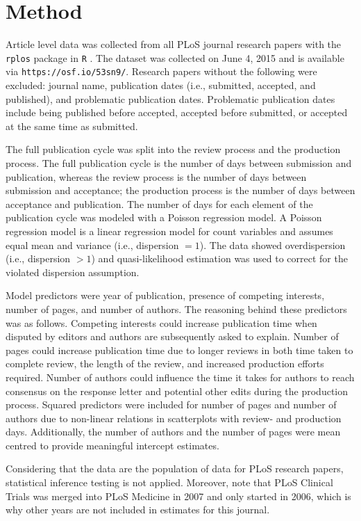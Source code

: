 \section*{Method}
Article level data was collected from all PLoS journal research papers with the \texttt{rplos} package \cite[v0.4.7][]{rplos} in \texttt{R} \cite[v3.2.0][]{rcran}. The dataset was collected on June 4, 2015 and is available via \texttt{https://osf.io/53sn9/}. Research papers without the following were excluded: journal name, publication dates (i.e., submitted, accepted, and published), and problematic publication dates. Problematic publication dates include being published before accepted, accepted before submitted, or accepted at the same time as submitted.

The full publication cycle was split into the review process and the production process. The full publication cycle is the number of days between submission and publication, whereas the review process is the number of days between submission and acceptance; the production process is the number of days between acceptance and publication. The number of days for each element of the publication cycle was modeled with a Poisson regression model. A Poisson regression model is a linear regression model for count variables and assumes equal mean and variance (i.e., dispersion $=1$). The data showed overdispersion (i.e., dispersion $>1$) and quasi-likelihood estimation was used to correct for the violated dispersion assumption.

Model predictors were year of publication, presence of competing interests, number of pages, and number of authors. The reasoning behind these predictors was as follows. Competing interests could increase publication time when disputed by editors and authors are subsequently asked to explain. Number of pages could increase publication time due to longer reviews in both time taken to complete review, the length of the review, and increased production efforts required. Number of authors could influence the time it takes for authors to reach consensus on the response letter and potential other edits during the production process. Squared predictors were included for number of pages and number of authors due to non-linear relations in scatterplots with review- and production days. Additionally, the number of authors and the number of pages were mean centred to provide meaningful intercept estimates.

Considering that the data are the population of data for PLoS research papers, statistical inference testing is not applied. Moreover, note that PLoS Clinical Trials was merged into PLoS Medicine in 2007 and only started in 2006, which is why other years are not included in estimates for this journal.